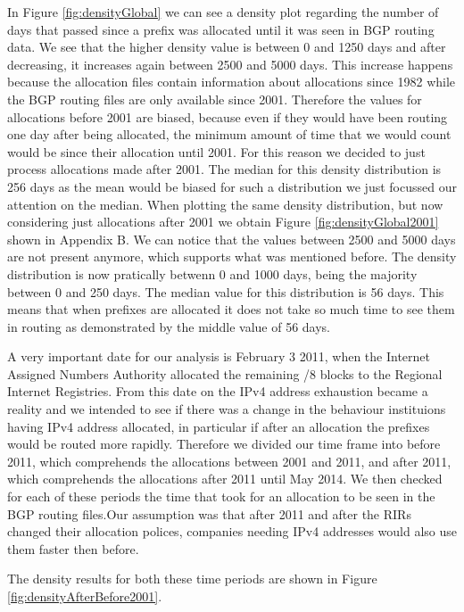 \documentclass[11pt,a4paper]{scrreprt}
\begin{document}
In Figure \ref{fig:densityGlobal} we can see a density plot regarding the number of days that passed since a prefix was allocated until it was seen in BGP routing data. 
We see that the higher density value is between 0 and 1250 days and after decreasing, it increases again between 2500 and 5000 days. This increase happens because the allocation files contain information about allocations since 1982 while the BGP routing files are only available since 2001. Therefore the values for allocations before 2001 are biased, because even if they would have been routing one day after being allocated, the minimum amount of time that we would count would be since their allocation until 2001. For this reason we decided to just process allocations made after 2001. The median for this density distribution is 256 days as the mean would be biased for such a distribution we just focussed our attention on the median.
When plotting the same density distribution, but now considering just allocations after 2001 we obtain Figure \ref{fig:densityGlobal2001} shown in Appendix B. We can notice that the values between 2500 and 5000 days are not present anymore, which supports what was mentioned before. The density distribution is now pratically betwenn 0 and 1000 days, being the majority between 0 and 250 days. The median value for this distribution is 56 days. This means that when prefixes are allocated it does not take so much time to see them in routing as demonstrated by the middle value of 56 days. 

A very important date for our analysis is February 3 2011, when the Internet Assigned Numbers Authority allocated the remaining /8 blocks to the Regional Internet Registries. From this date on the IPv4 address exhaustion became a reality and we intended to see if there was a change in the behaviour instituions having IPv4 address allocated, in particular if after an allocation the prefixes would be routed more rapidly. Therefore we divided our time frame into before 2011, which comprehends the allocations between 2001 and 2011, and after 2011, which comprehends the allocations after 2011 until May 2014. We then checked for each of these periods the time that took for an allocation to be seen in the BGP routing files.Our assumption was that after 2011 and after the RIRs changed their allocation polices, companies needing IPv4 addresses would also use them faster then before. 

The density results for both these time periods are shown in Figure \ref{fig:densityAfterBefore2001}.
\end{document}
